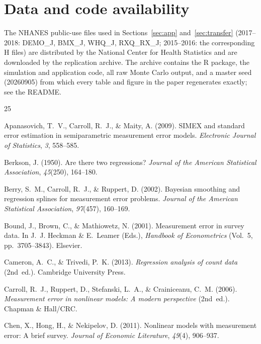 \section*{Data and code availability}\label{sec:data}

The NHANES public-use files used in Sections~\ref{sec:app}
and~\ref{sec:transfer} (2017--2018: DEMO\_J, BMX\_J, WHQ\_J,
RXQ\_RX\_J; 2015--2016: the corresponding H files) are distributed by
the National Center for Health Statistics and are downloaded by the
replication archive. The archive contains the R
package, the simulation and application code, all raw Monte Carlo
output, and a master seed (20260905) from which every table and figure
in the paper regenerates exactly; see the README.

\begin{thebibliography}{25}
\providecommand{\natexlab}[1]{#1}

Apanasovich, T.~V., Carroll, R.~J., \& Maity, A. (2009). SIMEX and
standard error estimation in semiparametric measurement error models.
\emph{Electronic Journal of Statistics}, \emph{3}, 558--585. %

Berkson, J. (1950). Are there two regressions? \emph{Journal of the
American Statistical Association}, \emph{45}(250), 164--180.

Berry, S.~M., Carroll, R.~J., \& Ruppert, D. (2002). Bayesian smoothing
and regression splines for measurement error problems. \emph{Journal
of the American Statistical Association}, \emph{97}(457), 160--169.

Bound, J., Brown, C., \& Mathiowetz, N. (2001). Measurement error in
survey data. In J.~J. Heckman \& E.~Leamer (Eds.), \emph{Handbook of
Econometrics} (Vol.~5, pp.~3705--3843). Elsevier.

Cameron, A.~C., \& Trivedi, P.~K. (2013). \emph{Regression analysis of
count data} (2nd~ed.). Cambridge University Press.

Carroll, R.~J., Ruppert, D., Stefanski, L.~A., \& Crainiceanu, C.~M.
(2006). \emph{Measurement error in nonlinear models: A modern
perspective} (2nd~ed.). Chapman \& Hall/CRC.

Chen, X., Hong, H., \& Nekipelov, D. (2011). Nonlinear models with
measurement error: A brief survey. \emph{Journal of Economic
Literature}, \emph{49}(4), 906--937.


\end{thebibliography}
